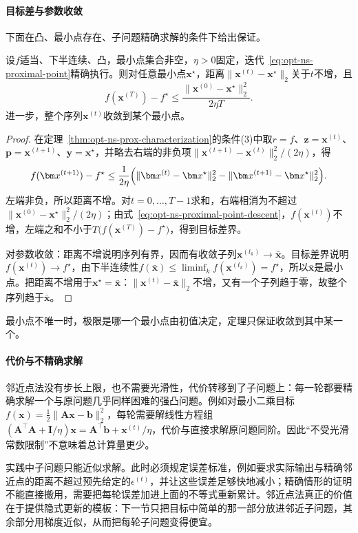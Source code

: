 \paragraph{目标差与参数收敛}
下面在凸、最小点存在、子问题精确求解的条件下给出保证。

\begin{theorem}[邻近点法的收敛]
\label{thm:opt-ns-proximal-point}
设$f$适当、下半连续、凸，最小点集合非空，$\eta>0$固定，迭代~\eqref{eq:opt-ns-proximal-point}精确执行。则对任意最小点$\bm x^\star$，距离$\lVert\bm x^{(t)}-\bm x^\star\rVert_2$关于$t$不增，且
\[
 f(\bm x^{(T)})-f^\star\leq\frac{\lVert\bm x^{(0)}-\bm x^\star\rVert_2^2}{2\eta T}.
\]
进一步，整个序列$\bm x^{(t)}$收敛到某个最小点。
\end{theorem}

\begin{proof}
在定理~\ref{thm:opt-ns-prox-characterization}的条件(3)中取$r=f$、$\bm z=\bm x^{(t)}$、$\bm p=\bm x^{(t+1)}$、$\bm y=\bm x^\star$，并略去右端的非负项$\lVert\bm x^{(t+1)}-\bm x^{(t)}\rVert_2^2/(2\eta)$，得
\[
 f(\bm x^{(t+1)})-f^\star\leq\frac1{2\eta}\Bigl(\lVert\bm x^{(t)}-\bm x^\star\rVert_2^2-\lVert\bm x^{(t+1)}-\bm x^\star\rVert_2^2\Bigr).
\]
左端非负，所以距离不增。对$t=0,\dots,T-1$求和，右端相消为不超过$\lVert\bm x^{(0)}-\bm x^\star\rVert_2^2/(2\eta)$；由式~\eqref{eq:opt-ns-proximal-point-descent}，$f(\bm x^{(t)})$不增，左端之和不小于$T\bigl(f(\bm x^{(T)})-f^\star\bigr)$，得到目标差界。

对参数收敛：距离不增说明序列有界，因而有收敛子列$\bm x^{(t_k)}\to\bar{\bm x}$。目标差界说明$f(\bm x^{(t)})\to f^\star$，由下半连续性$f(\bar{\bm x})\leq\liminf_kf(\bm x^{(t_k)})=f^\star$，所以$\bar{\bm x}$是最小点。把距离不增用于$\bm x^\star=\bar{\bm x}$：$\lVert\bm x^{(t)}-\bar{\bm x}\rVert_2$不增，又有一个子列趋于零，故整个序列趋于$\bar{\bm x}$。
\end{proof}

最小点不唯一时，极限是哪一个最小点由初值决定，定理只保证收敛到其中某一个。

\paragraph{代价与不精确求解}
邻近点法没有步长上限，也不需要光滑性，代价转移到了子问题上：每一轮都要精确求解一个与原问题几乎同样困难的强凸问题。例如对最小二乘目标$f(\bm x)=\frac12\lVert\bm A\bm x-\bm b\rVert_2^2$，每轮需要解线性方程组$(\bm A^\top\bm A+\bm I/\eta)\bm x=\bm A^\top\bm b+\bm x^{(t)}/\eta$，代价与直接求解原问题同阶。因此“不受光滑常数限制”不意味着总计算量更少。

实践中子问题只能近似求解。此时必须规定误差标准，例如要求实际输出与精确邻近点的距离不超过预先给定的$\epsilon^{(t)}$，并让这些误差足够快地减小；精确情形的证明不能直接搬用，需要把每轮误差加进上面的不等式重新累计。邻近点法真正的价值在于提供隐式更新的模板：下一节只把目标中简单的那一部分放进邻近子问题，其余部分用梯度近似，从而把每轮子问题变得便宜。
